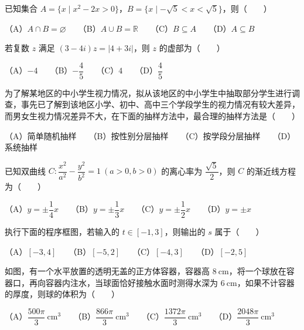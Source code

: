 \begin{question}
已知集合 $A=\{x\mid x^2-2x>0\}$，$B=\{x\mid-\sqrt5<x<\sqrt5\}$，则\mbox{（　　）}

（A）$A\cap B=\varnothing$　　（B）$A\cup B=\mathbb R$　　（C）$B\subseteq A$　　（D）$A\subseteq B$

\end{question}
\begin{question}
若复数 $z$ 满足 $(3-4i)z=|4+3i|$，则 $z$ 的虚部为\mbox{（　　）}

（A）$-4$　　（B）$-\dfrac45$　　（C）$4$　　（D）$\dfrac45$

\end{question}
\begin{question}
为了解某地区的中小学生视力情况，拟从该地区的中小学生中抽取部分学生进行调查，事先已了解到该地区小学、初中、高中三个学段学生的视力情况有较大差异，而男女生视力情况差异不大，在下面的抽样方法中，最合理的抽样方法是\mbox{（　　）}

（A）简单随机抽样　　（B）按性别分层抽样　　（C）按学段分层抽样　　（D）系统抽样

\end{question}
\begin{question}
已知双曲线 $C:\dfrac{x^2}{a^2}-\dfrac{y^2}{b^2}=1\ (a>0,b>0)$ 的离心率为 $\dfrac{\sqrt5}{2}$，则 $C$ 的渐近线方程为\mbox{（　　）}

（A）$y=\pm\dfrac14x$　　（B）$y=\pm\dfrac13x$　　（C）$y=\pm\dfrac12x$　　（D）$y=\pm x$

\Needspace{0.4\textheight}
\end{question}
\begin{question}
执行下面的程序框图，若输入的 $t\in[-1,3]$，则输出的 $s$ 属于\mbox{（　　）}
\nopagebreak[4]
\begin{center}\end{center}
\nopagebreak[4]
（A）$[-3,4]$　　（B）$[-5,2]$　　（C）$[-4,3]$　　（D）$[-2,5]$

\Needspace{0.4\textheight}
\end{question}
\begin{question}
如图，有一个水平放置的透明无盖的正方体容器，容器高 $8\ \mathrm{cm}$，将一个球放在容器口，再向容器内注水，当球面恰好接触水面时测得水深为 $6\ \mathrm{cm}$，如果不计容器的厚度，则球的体积为\mbox{（　　）}
\nopagebreak[4]
\begin{center}\end{center}
\nopagebreak[4]
（A）$\dfrac{500\pi}{3}\ \mathrm{cm}^3$　　（B）$\dfrac{866\pi}{3}\ \mathrm{cm}^3$　　（C）$\dfrac{1372\pi}{3}\ \mathrm{cm}^3$　　（D）$\dfrac{2048\pi}{3}\ \mathrm{cm}^3$

\end{question}
